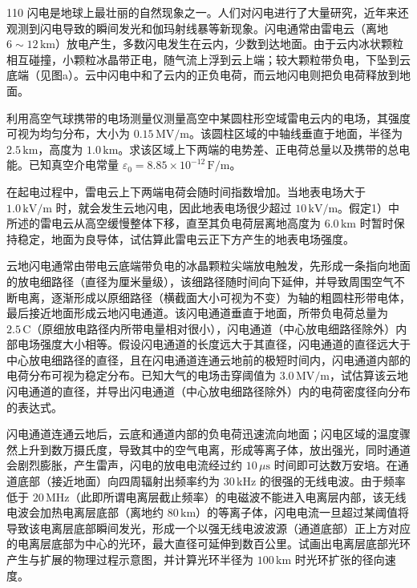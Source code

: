 \begin{problem}[2019年第36届全国中学生物理竞赛复赛][雷电云与闪电物理]{110}
闪电是地球上最壮丽的自然现象之一。人们对闪电进行了大量研究，近年来还观测到闪电导致的瞬间发光和伽玛射线暴等新现象。闪电通常由雷电云（离地 $6\sim12\,\mathrm{km}$）放电产生，多数闪电发生在云内，少数到达地面。由于云内冰状颗粒相互碰撞，小颗粒冰晶带正电，随气流上浮到云上端；较大颗粒带负电，下坠到云底端（见图a）。云中闪电中和了云内的正负电荷，而云地闪电则把负电荷释放到地面。
\begin{subproblem}
利用高空气球携带的电场测量仪测量高空中某圆柱形空域雷电云内的电场，其强度可视为均匀分布，大小为 $0.15\,\mathrm{MV/m}$。该圆柱区域的中轴线垂直于地面，半径为 $2.5\,\mathrm{km}$，高度为 $1.0\,\mathrm{km}$。求该区域上下两端的电势差、正电荷总量以及携带的总电能。已知真空介电常量 $\varepsilon_{0}=8.85\times10^{-12}\,\mathrm{F/m}$。
\end{subproblem}
\begin{subproblem}
在起电过程中，雷电云上下两端电荷会随时间指数增加。当地表电场大于 $1.0\,\mathrm{kV/m}$ 时，就会发生云地闪电，因此地表电场很少超过 $10\,\mathrm{kV/m}$。假定1）中所述的雷电云从高空缓慢整体下移，直至其负电荷层离地高度为 $6.0\,\mathrm{km}$ 时暂时保持稳定，地面为良导体，试估算此雷电云正下方产生的地表电场强度。
\end{subproblem}
\begin{subproblem}
云地闪电通常由带电云底端带负电的冰晶颗粒尖端放电触发，先形成一条指向地面的放电细路径（直径为厘米量级），该细路径随时间向下延伸，并导致周围空气不断电离，逐渐形成以原细路径（横截面大小可视为不变）为轴的粗圆柱形带电体，最后接近地面形成云地闪电通道。该闪电通道垂直于地面，所带负电荷总量为 $2.5\,\mathrm{C}$（原细放电路径内所带电量相对很小），闪电通道（中心放电细路径除外）内部电场强度大小相等。假设闪电通道的长度远大于其直径，闪电通道的直径远大于中心放电细路径的直径，且在闪电通道连通云地前的极短时间内，闪电通道内部的电荷分布可视为稳定分布。已知大气的电场击穿阈值为 $3.0\,\mathrm{MV/m}$，试估算该云地闪电通道的直径，并导出闪电通道（中心放电细路径除外）内的电荷密度径向分布的表达式。
\end{subproblem}
\begin{subproblem}
闪电通道连通云地后，云底和通道内部的负电荷迅速流向地面；闪电区域的温度骤然上升到数万摄氏度，导致其中的空气电离，形成等离子体，放出强光，同时通道会剧烈膨胀，产生雷声，闪电的放电电流经过约 $10\,\mu\mathrm{s}$ 时间即可达数万安培。在通道底部（接近地面）向四周辐射出频率约为 $30\,\mathrm{kHz}$ 的很强的无线电波。由于频率低于 $20\,\mathrm{MHz}$（此即所谓电离层截止频率）的电磁波不能进入电离层内部，该无线电波会加热电离层底部（离地约 $80\,\mathrm{km}$）的等离子体，闪电电流一旦超过某阈值将导致该电离层底部瞬间发光，形成一个以强无线电波波源（通道底部）正上方对应的电离层底部为中心的光环，最大直径可延伸到数百公里。试画出电离层底部光环产生与扩展的物理过程示意图，并计算光环半径为 $100\,\mathrm{km}$ 时光环扩张的径向速度。

\end{subproblem}
\end{problem}
